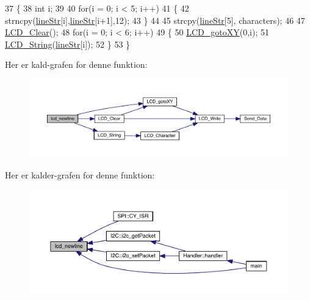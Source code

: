 \begin{DoxyCode}
37 \{
38   \textcolor{keywordtype}{int} i;
39   
40   \textcolor{keywordflow}{for}(i = 0; i < 5; i++)
41   \{
42     strncpy(\hyperlink{class_l_c_d_a51a220275e6d21942189276ef7d9e7c3}{lineStr}[i],\hyperlink{class_l_c_d_a51a220275e6d21942189276ef7d9e7c3}{lineStr}[i+1],12);
43   \}
44   
45   strcpy(\hyperlink{class_l_c_d_a51a220275e6d21942189276ef7d9e7c3}{lineStr}[5], characters);
46   
47   \hyperlink{_nokia5110_l_c_d_8c_ae60d0b62d7eb3fa31266c095d7b3c245}{LCD\_Clear}();
48   \textcolor{keywordflow}{for}(i = 0; i < 6; i++)
49   \{
50     \hyperlink{_nokia5110_l_c_d_8c_adde1a4c2e7bd6bc1bbeb7694db45925b}{LCD\_gotoXY}(0,i);
51     \hyperlink{_nokia5110_l_c_d_8c_a4c2c90307f23817e8445be5c6ca537c5}{LCD\_String}(\hyperlink{class_l_c_d_a51a220275e6d21942189276ef7d9e7c3}{lineStr}[i]);
52   \}
53 \}
\end{DoxyCode}


Her er kald-\/grafen for denne funktion\+:\nopagebreak
\begin{figure}[H]
\begin{center}
\leavevmode
\includegraphics[width=350pt]{df/dd6/class_l_c_d_a507dd352aee8161dc556e3d1439a2be2_cgraph}
\end{center}
\end{figure}




Her er kalder-\/grafen for denne funktion\+:\nopagebreak
\begin{figure}[H]
\begin{center}
\leavevmode
\includegraphics[width=350pt]{df/dd6/class_l_c_d_a507dd352aee8161dc556e3d1439a2be2_icgraph}
\end{center}
\end{figure}




